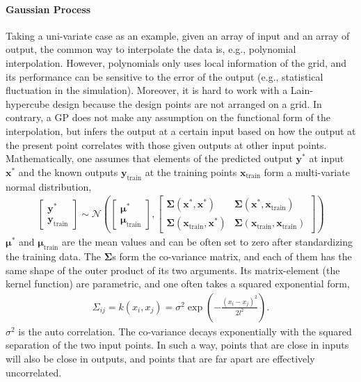 \paragraph{Gaussian Process} Taking a uni-variate case as an example, given an array of input and an array of output, the common way to interpolate the data is, e.g., polynomial interpolation.
However, polynomials only uses local information of the grid, and its performance can be sensitive to the error of the output (e.g., statistical fluctuation in the simulation).
Moreover, it is hard to work with a Lain-hypercube design because the design points are not arranged on a grid.
In contrary, a GP does not make any assumption on the functional form of the interpolation, but infers the output at a certain input based on how the output at the present point correlates with those given outputs at other input points.
Mathematically, one assumes that elements of the predicted output $\mathbf{y}^*$ at input $\mathbf{x^*}$ and the known outputs $\mathbf{y}_{\textrm{train}}$ at the training points $\mathbf{x}_{\textrm{train}}$ form a multi-variate normal distribution,
\begin{eqnarray}
\begin{bmatrix}
\mathbf{y}^* \\
\mathbf{y}_{\textrm{train}}
\end{bmatrix}
\sim
\mathcal{N}\left(
\begin{bmatrix}
\mathbf{\mu}^* \\
\mathbf{\mu}_{\textrm{train}}
\end{bmatrix},
\begin{bmatrix}
\mathbf{\Sigma}(\mathbf{x}^*, \mathbf{x}^*)& \mathbf{\Sigma}(\mathbf{x}^*, \mathbf{x}_{\textrm{train}}) \\
\mathbf{\Sigma}(\mathbf{x}_{\textrm{train}}, \mathbf{x}^*)& \mathbf{\Sigma}(\mathbf{x}_{\textrm{train}}, \mathbf{x}_{\textrm{train}})
\end{bmatrix}
\right)
\end{eqnarray}
$\mathbf{\mu}^*$ and $\mathbf{\mu}_{\textrm{train}}$ are the mean values and can be often set to zero after standardizing the training data.
The $\mathbf{\Sigma}$s form the co-variance matrix, and each of them has the same shape of the outer product of its two arguments.
Its matrix-element (the kernel function) are parametric, and one often takes a squared exponential form,
\begin{eqnarray}
\Sigma_{ij} = k(x_i, x_j) = \sigma^2 \exp\left(-\frac{(x_i-x_j)^2}{2l^2}\right).
\end{eqnarray}
$\sigma^2$ is the auto correlation. 
The co-variance decays exponentially with the squared separation of the two input points.
In such a way, points that are close in inputs will also be close in outputs, and points that are far apart are effectively uncorrelated.

